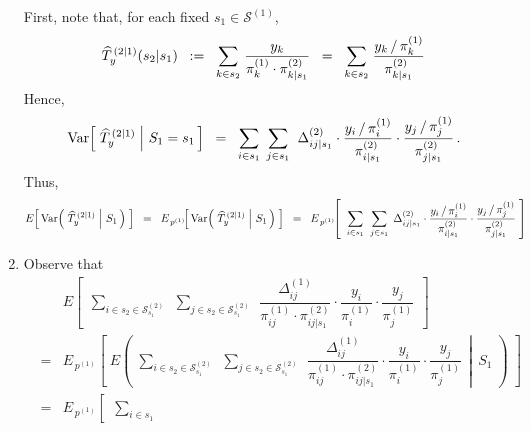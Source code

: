 \begin{enumerate}
	First, note that, for each fixed $s_{1} \in \mathcal{S}^{(1)}$,
	\begin{equation*}
	\widehat{T}^{\,(2 \vert 1)}_{y}(s_{2} \vert s_{1})
	\;\; := \;\;
		\underset{k \in s_{2}}{\sum}\;\dfrac{y_{k}}{ \pi^{(1)}_{k} \cdot \pi^{(2)}_{k \vert s_{1}} }
	\;\; = \;\;
		\underset{k \in s_{2}}{\sum}\;\dfrac{ y_{k} \,/\, \pi^{(1)}_{k} }{ \pi^{(2)}_{k \vert s_{1}} }
	\end{equation*}
	Hence,
	\begin{equation*}
	\textnormal{Var}\!\left[\, \left.\widehat{T}^{\,(2 \vert 1)}_{y} \;\right\vert\, S_{1} = s_{1} \,\right]
	\;\; = \;\;
		\underset{i \in s_{1}}{\sum}\;\,
		\underset{j \in s_{1}}{\sum}\;\;
			\Delta^{(2)}_{ij \vert s_{1}}
			\cdot
			\dfrac{ y_{i} \,/\, \pi^{(1)}_{i} }{ \pi^{(2)}_{i \vert s_{1}} }
			\cdot
			\dfrac{ y_{j} \,/\, \pi^{(1)}_{j} }{ \pi^{(2)}_{j \vert s_{1}} }\,.
	\end{equation*}
	Thus,
	\begin{equation*}
	E\!\left[\, \textnormal{Var}\!\left(\, \left.\widehat{T}^{\,(2 \vert 1)}_{y} \;\right\vert\, S_{1} \,\right) \;\right]
	\;\; = \;\;
		E_{\,p^{(1)}}\!\!\left[\, \textnormal{Var}\!\left(\, \left.\widehat{T}^{\,(2 \vert 1)}_{y} \;\right\vert\, S_{1} \,\right) \;\right]
	\;\; = \;\;
		E_{\,p^{(1)}}\!\!\left[\;\;
			\underset{i \in s_{1} }{\sum}\;\;
			\underset{j \in s_{1} }{\sum}\;\,
				\Delta^{(2)}_{ij \vert s_{1}}
				\cdot
				\dfrac{ y_{i} \,/\, \pi^{(1)}_{i} }{ \pi^{(2)}_{i \vert s_{1}} }
				\cdot
				\dfrac{ y_{j} \,/\, \pi^{(1)}_{j} }{ \pi^{(2)}_{j \vert s_{1}} }
		\;\right]
	\end{equation*}
\item
	Observe that
	\begin{eqnarray*}
	&&
		E\!\left[\;\,
			\underset{i \in s_{2} \in \mathcal{S}^{(2)}_{s_{1}} }{\sum}\;\,
			\underset{j \in s_{2} \in \mathcal{S}^{(2)}_{s_{1}} }{\sum}\;\,
				\dfrac{ \Delta^{(1)}_{ij} }{ \pi^{(1)}_{ij} \cdot \pi^{(2)}_{ij \vert s_{1}} }
				\cdot
				\dfrac{y_{i}}{\pi^{(1)}_{i}}
				\cdot
				\dfrac{y_{j}}{\pi^{(1)}_{j}}
		\,\;\right]
	\\
	& = &
		E_{\,p^{(1)}}\!\!\left[\;E\!\left(\;
		\left.
			\underset{i \in s_{2} \in \mathcal{S}^{(2)}_{s_{1}} }{\sum}\;\,
			\underset{j \in s_{2} \in \mathcal{S}^{(2)}_{s_{1}} }{\sum}\;\,
				\dfrac{ \Delta^{(1)}_{ij} }{ \pi^{(1)}_{ij} \cdot \pi^{(2)}_{ij \vert s_{1}} }
				\cdot
				\dfrac{y_{i}}{\pi^{(1)}_{i}}
				\cdot
				\dfrac{y_{j}}{\pi^{(1)}_{j}}
		\,\;\right\vert\;\,
			S_{1}
		\;\right)\;\right]
	\\
	& = &
		E_{\,p^{(1)}}\!\!\left[\;\,
			\underset{i \in s_{1}}{\sum}\;\,

\end{eqnarray*}
\end{enumerate}
